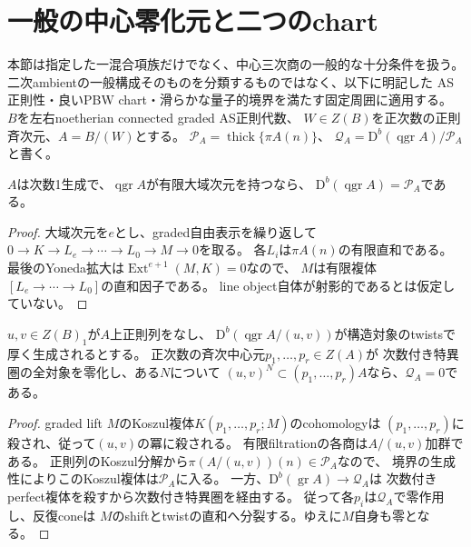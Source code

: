 \section{一般の中心零化元と二つのchart}
\label{sec:quotient-global-regularity}
本節は指定した一混合項族だけでなく、中心三次商の一般的な十分条件を扱う。
二次ambientの一般構成そのものを分類するものではなく、以下に明記した
AS正則性・良いPBW chart・滑らかな量子的境界を満たす固定周囲に適用する。
$B$を左右noetherian connected graded AS正則代数、
$W\in Z(B)$を正次数の正則斉次元、$A=B/(W)$とする。
$\mathcal P_A=\operatorname{thick}\{\pi A(n)\}$、
$\mathcal Q_A=\mathrm D^b(\operatorname{qgr}A)/\mathcal P_A$と書く。

\begin{lemma}[有限大域次元からtwistsによる生成へ]
\label{lem:global-finite-to-perfect}
$A$は次数1生成で、$\operatorname{qgr}A$が有限大域次元を持つなら、
$\mathrm D^b(\operatorname{qgr}A)=\mathcal P_A$である。
\end{lemma}
\begin{proof}
大域次元を$e$とし、graded自由表示を繰り返して
$0\to K\to L_e\to\cdots\to L_0\to M\to0$を取る。
各$L_i$は$\pi A(n)$の有限直和である。
最後のYoneda拡大は$\operatorname{Ext}^{e+1}(M,K)=0$なので、
$M$は有限複体$[L_e\to\cdots\to L_0]$の直和因子である。
line object自体が射影的であるとは仮定していない。
\end{proof}

\begin{proposition}[中心零化元による十分条件]
\label{prop:global-annihilators}
$u,v\in Z(B)_1$が$A$上正則列をなし、
$\mathrm D^b(\operatorname{qgr}A/(u,v))$が構造対象のtwistsで厚く生成されるとする。
正次数の斉次中心元$p_1,\ldots,p_r\in Z(A)$が
次数付き特異圏の全対象を零化し、ある$N$について
$(u,v)^N\subset(p_1,\ldots,p_r)A$なら、$\mathcal Q_A=0$である。
\end{proposition}
\begin{proof}
graded lift $M$のKoszul複体$K(p_1,\ldots,p_r;M)$のcohomologyは
$(p_1,\ldots,p_r)$に殺され、従って$(u,v)$の冪に殺される。
有限filtrationの各商は$A/(u,v)$加群である。
正則列のKoszul分解から$\pi(A/(u,v))(n)\in\mathcal P_A$なので、
境界の生成性によりこのKoszul複体は$\mathcal P_A$に入る。
一方、$\mathrm D^b(\operatorname{gr}A)\to\mathcal Q_A$は
次数付きperfect複体を殺すから次数付き特異圏を経由する。
従って各$p_i$は$\mathcal Q_A$で零作用し、反復coneは
$M$のshiftとtwistの直和へ分裂する。ゆえに$M$自身も零となる。
\end{proof}

